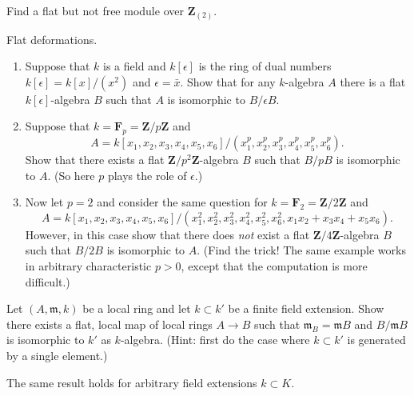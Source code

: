 \begin{exercise}
\label{exercise-flat-not-free-dvr}
Find a flat but not free module over ${\mathbf Z}_{(2)}$.
\end{exercise}

\begin{exercise}
\label{exercise-flat-deformations}
Flat deformations.
\begin{enumerate}
\item Suppose that $k$ is a field and $k[\epsilon]$ is the ring of
dual numbers $k[\epsilon] = k[x]/(x^2)$ and $\epsilon = \bar x$. Show that for
any $k$-algebra $A$ there is a flat $k[\epsilon]$-algebra $B$ such that
$A$ is isomorphic to $B/\epsilon B$.
\item Suppose that $k = {\mathbf F}_p = {\mathbf Z}/p{\mathbf Z}$ and
$$
A = k[x_1, x_2, x_3, x_4, x_5, x_6]/
(x_1^p, x_2^p, x_3^p, x_4^p, x_5^p, x_6^p).
$$
Show that there exists a flat ${\mathbf Z}/p^2{\mathbf Z}$-algebra $B$ such
that $B/pB$ is isomorphic to $A$. (So here $p$ plays the role of $\epsilon$.)
\item Now let $p = 2$ and consider the same question for
$k = {\mathbf F}_2 = {\mathbf Z}/2{\mathbf Z}$ and
$$
A = k[x_1, x_2, x_3, x_4, x_5, x_6]/
(x_1^2, x_2^2, x_3^2, x_4^2, x_5^2, x_6^2, x_1x_2 + x_3x_4 + x_5x_6).
$$
However, in this case show that there does {\it not} exist a flat
${\mathbf Z}/4{\mathbf Z}$-algebra $B$ such that $B/2B$ is isomorphic to
$A$. (Find the trick! The same example works in arbitrary characteristic
$p>0$, except that the computation is more difficult.)
\end{enumerate}
\end{exercise}

\begin{exercise}
\label{exercise-flat-given-residue-field-extension}
Let $(A, {\mathfrak m}, k)$ be a local ring and let $k \subset k'$ be
a finite field extension. Show there exists a flat, local map of
local rings $A \to B$ such that ${\mathfrak m}_B = {\mathfrak m} B$ and
$B/{\mathfrak m} B$ is
isomorphic to $k'$ as $k$-algebra. (Hint: first do the case where
$k \subset k'$ is generated by a single element.)
\end{exercise}

\begin{remark}
\label{remark-flat-given-residue-field-extension-general}
The same result holds for arbitrary field extensions $k \subset K$.
\end{remark}










